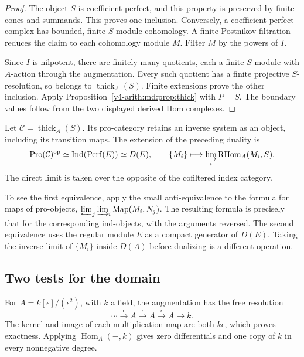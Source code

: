 \begin{proof}
The object $S$ is coefficient-perfect, and this property is
preserved by finite cones and summands. This proves one inclusion.
Conversely, a coefficient-perfect complex has bounded, finite
$S$-module cohomology. A finite Postnikov filtration reduces the
claim to each cohomology module $M$. Filter $M$ by the powers of
$I$.

Since $I$ is nilpotent, there are finitely many quotients,
each a finite $S$-module with $A$-action through the augmentation.
Every such quotient has a finite projective $S$-resolution, so
belongs to $\operatorname{thick}_A(S)$. Finite extensions prove
the other inclusion. Apply Proposition~\ref{v4-arith:md:prop:thick}
with $P=S$. The boundary values follow from the two displayed
derived Hom complexes.
\end{proof}

Let $\mathcal C=\operatorname{thick}_A(S)$. Its pro-category
retains an inverse system as an object, including its transition
maps. The extension of the preceding duality is
\begin{equation}\label{v4-arith:md:eq:pro-ind}
 \operatorname{Pro}(\mathcal C)^{\mathrm{op}}
 \simeq\operatorname{Ind}(\operatorname{Perf}(E))
 \simeq D(E),\qquad
 \{M_i\}\longmapsto\varinjlim_i\operatorname{RHom}_A(M_i,S).
\end{equation}
The direct limit is taken over the opposite of the cofiltered
index category.

To see the first equivalence, apply the small
anti-equivalence to the formula for maps of pro-objects,
$\varprojlim_j\varinjlim_i\operatorname{Map}(M_i,N_j)$.
The resulting formula is precisely that for the corresponding
ind-objects, with the arguments reversed. The second equivalence
uses the regular module $E$ as a compact generator of $D(E)$.
Taking the inverse limit of $\{M_i\}$ inside $D(A)$ before
dualizing is a different operation.

\subsection{Two tests for the domain}

For $A=k[\epsilon]/(\epsilon^2)$, with $k$ a field, the
augmentation has the free resolution
\[
 \cdots\xrightarrow{\epsilon}A
 \xrightarrow{\epsilon}A\xrightarrow{\epsilon}A\longrightarrow k.
\]
The kernel and image of each multiplication map are both
$k\epsilon$, which proves exactness. Applying
$\operatorname{Hom}_A(-,k)$ gives zero differentials and one
copy of $k$ in every nonnegative degree.


